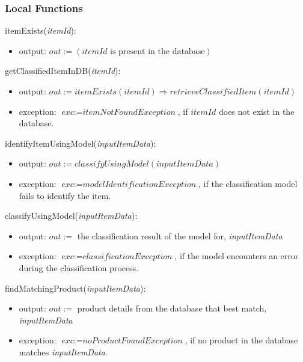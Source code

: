 \documentclass[12pt, titlepage]{article}
\begin{document}
\subsubsection{Local Functions}

\noindent itemExists(\textit{itemId}):
\begin{itemize}
  \item output: $out := (\textit{itemId} \text{ is present in the database})$
\end{itemize}

\noindent getClassifiedItemInDB(\textit{itemId}):
\begin{itemize}
  \item output: $out := \textit{itemExists}(\textit{itemId}) \Rightarrow \textit{retrieveClassifiedItem}(\textit{itemId})$
  \item exception: $\textit{exc} := \textit{itemNotFoundException}$, if $\textit{itemId}$ does not exist in the database.
\end{itemize}

\noindent identifyItemUsingModel(\textit{inputItemData}):
\begin{itemize}
  \item output: $out := \textit{classifyUsingModel}(\textit{inputItemData})$
  \item exception: $\textit{exc} := \textit{modelIdentificationException}$, if the classification model fails to identify the item.
\end{itemize}

\noindent classifyUsingModel(\textit{inputItemData}):
\begin{itemize}
  \item output: $out :=$ the classification result of the model for, \textit{inputItemData}
  \item exception: $\textit{exc} := \textit{classificationException}$, if the model encounters an error during the classification process.
\end{itemize}

\noindent findMatchingProduct(\textit{inputItemData}):
\begin{itemize}
  \item output: $out :=$ product details from the database that best match, \textit{inputItemData}
  \item exception: $\textit{exc} := \textit{noProductFoundException}$, if no product in the database matches \textit{inputItemData}.
\end{itemize}

\newpage
\end{document}
